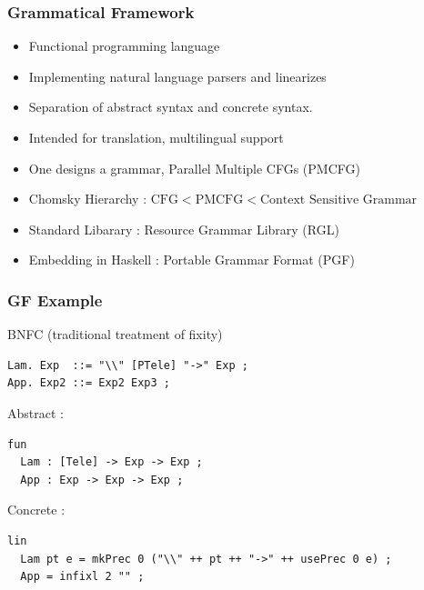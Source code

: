 \documentclass{beamer}
\begin{document}
\begin{frame}

\frametitle{Grammatical Framework}

\begin{itemize}
\item Functional programming language
\item Implementing natural language parsers and linearizes
\item Separation of abstract syntax and concrete syntax.
\item Intended for translation, multilingual support
\item One designs a grammar, Parallel Multiple CFGs (PMCFG)
\item Chomsky Hierarchy : $\text{CFG} < \text{PMCFG} < \text{Context Sensitive Grammar}$
\item Standard Libarary : Resource Grammar Library (RGL)
\item Embedding in Haskell : Portable Grammar Format (PGF)
\end{itemize}

\end{frame}

\begin{frame}[fragile]
\frametitle{GF Example}

BNFC (traditional treatment of fixity)

\begin{verbatim}
Lam. Exp  ::= "\\" [PTele] "->" Exp ;
App. Exp2 ::= Exp2 Exp3 ;
\end{verbatim}

Abstract :

\begin{verbatim}
fun
  Lam : [Tele] -> Exp -> Exp ;
  App : Exp -> Exp -> Exp ;
\end{verbatim}

Concrete :

\begin{verbatim}
lin
  Lam pt e = mkPrec 0 ("\\" ++ pt ++ "->" ++ usePrec 0 e) ;
  App = infixl 2 "" ;
\end{verbatim}
\end{frame}
\end{document}
